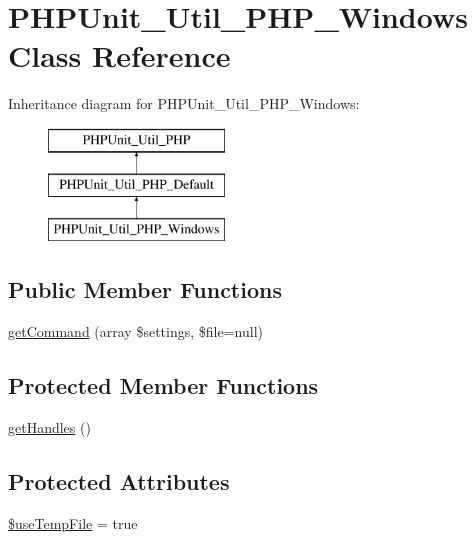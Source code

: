 \hypertarget{class_p_h_p_unit___util___p_h_p___windows}{}\section{P\+H\+P\+Unit\+\_\+\+Util\+\_\+\+P\+H\+P\+\_\+\+Windows Class Reference}
\label{class_p_h_p_unit___util___p_h_p___windows}
Inheritance diagram for P\+H\+P\+Unit\+\_\+\+Util\+\_\+\+P\+H\+P\+\_\+\+Windows\+:\begin{figure}[H]
\begin{center}
\leavevmode
\includegraphics[height=3.000000cm]{class_p_h_p_unit___util___p_h_p___windows}
\end{center}
\end{figure}
\subsection*{Public Member Functions}
\begin{DoxyCompactItemize}
\item 
\mbox{\hyperlink{class_p_h_p_unit___util___p_h_p___windows_a2c4a30cba6979f1463dfe4dc50d7bd9f}{get\+Command}} (array \$settings, \$file=null)
\end{DoxyCompactItemize}
\subsection*{Protected Member Functions}
\begin{DoxyCompactItemize}
\item 
\mbox{\hyperlink{class_p_h_p_unit___util___p_h_p___windows_ae5dbd216c09bda4ea76d2ca28e27eb00}{get\+Handles}} ()
\end{DoxyCompactItemize}
\subsection*{Protected Attributes}
\begin{DoxyCompactItemize}
\item 
\mbox{\hyperlink{class_p_h_p_unit___util___p_h_p___windows_a113533f069a8ccbf5509a9c20da7643f}{\$use\+Temp\+File}} = true
\end{DoxyCompactItemize}
